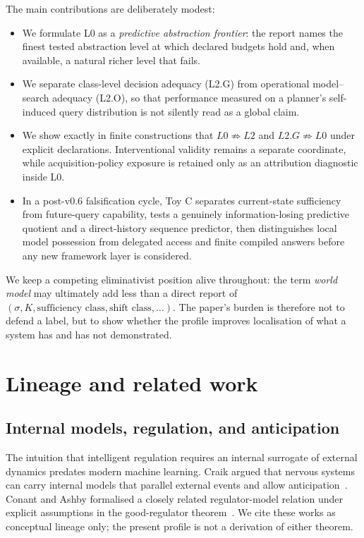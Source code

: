 \documentclass[10pt]{article}
\begin{document}
The main contributions are deliberately modest:
\begin{itemize}
    \item We formulate L0 as a \emph{predictive abstraction frontier}: the report names the finest tested abstraction level at which declared budgets hold and, when available, a natural richer level that fails.
    \item We separate class-level decision adequacy (L2.G) from operational model--search adequacy (L2.O), so that performance measured on a planner's self-induced query distribution is not silently read as a global claim.
    \item We show exactly in finite constructions that $L0\not\Rightarrow L2$ and $L2.G\not\Rightarrow L0$ under explicit declarations. Interventional validity remains a separate coordinate, while acquisition-policy exposure is retained only as an attribution diagnostic inside L0.
    \item In a post-v0.6 falsification cycle, Toy C separates current-state sufficiency from future-query capability, tests a genuinely information-losing predictive quotient and a direct-history sequence predictor, then distinguishes local model possession from delegated access and finite compiled answers before any new framework layer is considered.
\end{itemize}

We keep a competing eliminativist position alive throughout: the term \emph{world model} may ultimately add less than a direct report of $(\sigma,K,\text{sufficiency class},\text{shift class},\ldots)$. The paper's burden is therefore not to defend a label, but to show whether the profile improves localisation of what a system has and has not demonstrated.

\section{Lineage and related work}

\subsection{Internal models, regulation, and anticipation}

The intuition that intelligent regulation requires an internal surrogate of external dynamics predates modern machine learning. Craik argued that nervous systems can carry internal models that parallel external events and allow anticipation~\cite{craik1943}. Conant and Ashby formalised a closely related regulator-model relation under explicit assumptions in the good-regulator theorem~\cite{conant1970}. We cite these works as conceptual lineage only; the present profile is not a derivation of either theorem.
\end{document}
